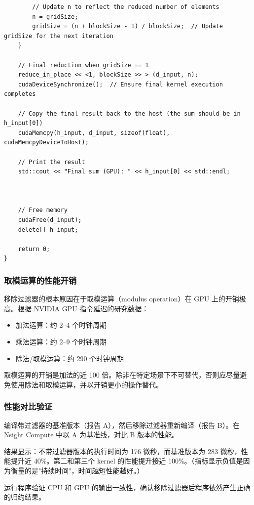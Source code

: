 \begin{lstlisting}
        // Update n to reflect the reduced number of elements
        n = gridSize;
        gridSize = (n + blockSize - 1) / blockSize;  // Update gridSize for the next iteration
    }

    // Final reduction when gridSize == 1
    reduce_in_place << <1, blockSize >> > (d_input, n);
    cudaDeviceSynchronize();  // Ensure final kernel execution completes

    // Copy the final result back to the host (the sum should be in h_input[0])
    cudaMemcpy(h_input, d_input, sizeof(float), cudaMemcpyDeviceToHost);

    // Print the result
    std::cout << "Final sum (GPU): " << h_input[0] << std::endl;

    

    // Free memory
    cudaFree(d_input);
    delete[] h_input;

    return 0;
}
\end{lstlisting}

\subsubsection{取模运算的性能开销}

移除过滤器的根本原因在于取模运算（modulus operation）在 GPU 上的开销极高。根据 NVIDIA GPU 指令延迟的研究数据：

\begin{itemize}
    \item 加法运算：约 2--4 个时钟周期
    \item 乘法运算：约 2--9 个时钟周期
    \item 除法/取模运算：约 290 个时钟周期
\end{itemize}

取模运算的开销是加法的近 100 倍。除非在特定场景下不可替代，否则应尽量避免使用除法和取模运算，并以开销更小的操作替代。

\subsubsection{性能对比验证}

编译带过滤器的基准版本（报告 A），然后移除过滤器重新编译（报告 B）。在 Nsight Compute 中以 A 为基准线，对比 B 版本的性能。

结果显示：不带过滤器版本的执行时间为 176 微秒，而基准版本为 283 微秒，性能提升近 40\%。第二和第三个 kernel 的性能提升接近 100\%。（指标显示负值是因为衡量的是"持续时间"，时间越短性能越好。）

运行程序验证 CPU 和 GPU 的输出一致性，确认移除过滤器后程序依然产生正确的归约结果。

